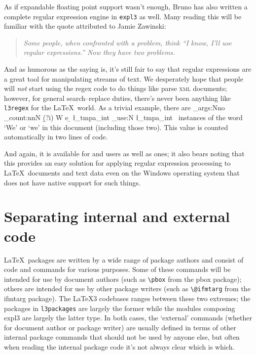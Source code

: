 \documentclass{ltnews}
\begin{document}
As if expandable floating point support wasn't enough, Bruno has also written a complete regular expression engine in \texttt{expl3} as well.
Many reading this will be familiar with the quote attributed to Jamie Zawinski:
\begin{quote}\itshape
Some people, when confronted with a problem, think
``I know, I'll use regular expressions.''
Now they have two problems.
\end{quote}
And as humorous as the saying is, it's still fair to say that regular expressions are a great tool for manipulating streams of text.
We desperately hope that people will \emph{not} start using the regex code to do things like parse \textsc{xml} documents; however, for general search--replace duties, there's never been anything like \texttt{l3regex} for the \LaTeX\ world.
As a trivial example, there are
\CatchFileDef{}%
\ExplSyntaxOn
\exp_args:Nno \regex_count:nnN { \b (?i) W e \b  } {\thisfile} \l_tmpa_int
\int_use:N \l_tmpa_int
\ExplSyntaxOff
~instances of the word `We' or `we' in this document (including those two).
This value is counted automatically in two lines of code.

And again, it is available for  and  users as well as  ones; it also bears noting that this provides an easy solution for applying regular expression processing to \LaTeX\ documents and text data even on the Windows operating system that does not have native support for such things.


\section{Separating internal and external code}

\LaTeX\ packages are written by a wide range of package authors and consist of code and commands for various purposes.
Some of these commands will be intended for use by document authors (such as \verb|\pbox| from the \textsf{pbox} package); others are intended for use by other package writers (such as \verb|\@ifmtarg| from the \textsf{ifmtarg} package).
The \LaTeX3 codebases ranges between these two extremes; the packages in \texttt{l3packages} are largely the former while the modules composing \textsf{expl3} are largely the latter type.
In both cases, the `external' commands (whether for document author or package writer) are usually defined in terms of other internal package commands that should not be used by anyone else, but often when reading the internal package code it's not always clear which is which.
\end{document}
